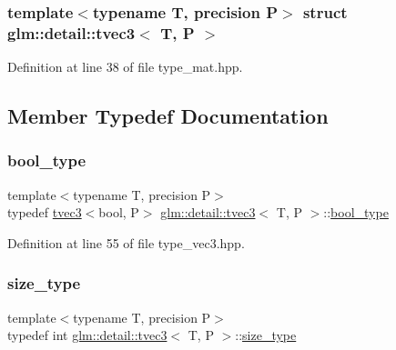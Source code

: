 \subsubsection*{template$<$typename T, precision P$>$\newline
struct glm\+::detail\+::tvec3$<$ T, P $>$}



Definition at line 38 of file type\+\_\+mat.\+hpp.



\subsection{Member Typedef Documentation}
\mbox{\label{structglm_1_1detail_1_1tvec3_aabd96f8052cc3964f695e9307a4ad403}} 
\subsubsection{\texorpdfstring{bool\+\_\+type}{bool\_type}}
{\footnotesize\ttfamily template$<$typename T, precision P$>$ \\
typedef \hyperlink{structglm_1_1detail_1_1tvec3}{tvec3}$<$bool, P$>$ \hyperlink{structglm_1_1detail_1_1tvec3}{glm\+::detail\+::tvec3}$<$ T, P $>$\+::\hyperlink{structglm_1_1detail_1_1tvec3_aabd96f8052cc3964f695e9307a4ad403}{bool\+\_\+type}}



Definition at line 55 of file type\+\_\+vec3.\+hpp.

\mbox{\label{structglm_1_1detail_1_1tvec3_a9c82390594a6adc72db5533c2f1013a4}} 
\subsubsection{\texorpdfstring{size\+\_\+type}{size\_type}}
{\footnotesize\ttfamily template$<$typename T, precision P$>$ \\
typedef int \hyperlink{structglm_1_1detail_1_1tvec3}{glm\+::detail\+::tvec3}$<$ T, P $>$\+::\hyperlink{structglm_1_1detail_1_1tvec3_a9c82390594a6adc72db5533c2f1013a4}{size\+\_\+type}}



